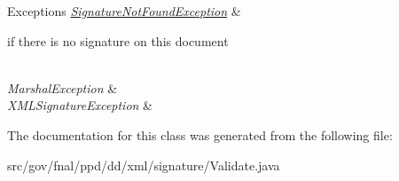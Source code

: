 \begin{DoxyExceptions}{Exceptions}
{\em \hyperlink{classgov_1_1fnal_1_1ppd_1_1dd_1_1xml_1_1signature_1_1SignatureNotFoundException}{Signature\-Not\-Found\-Exception}} & 
\begin{DoxyItemize}
\item if there is no signature on this document 
\end{DoxyItemize}\\
\hline
{\em Marshal\-Exception} & \\
\hline
{\em X\-M\-L\-Signature\-Exception} & \\
\hline
\end{DoxyExceptions}


The documentation for this class was generated from the following file\-:\begin{DoxyCompactItemize}
\item 
src/gov/fnal/ppd/dd/xml/signature/Validate.\-java\end{DoxyCompactItemize}
